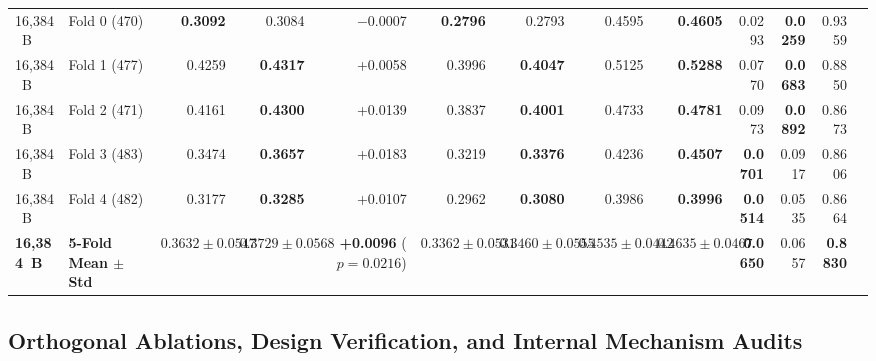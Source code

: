 \documentclass[journal]{IEEEtran}
\begin{document}
\begin{table}[!tbp]
{\begin{tabular}{llrrrrrrrrrrr}
\midrule
16,384~B & Fold 0 (470) & \textbf{0.3092} & 0.3084 & $-$0.0007 & \textbf{0.2796} & 0.2793 & 0.4595 & \textbf{0.4605} & 0.0293 & \textbf{0.0259} & 0.9359 \\
16,384~B & Fold 1 (477) & 0.4259 & \textbf{0.4317} & +0.0058 & 0.3996 & \textbf{0.4047} & 0.5125 & \textbf{0.5288} & 0.0770 & \textbf{0.0683} & 0.8850 \\
16,384~B & Fold 2 (471) & 0.4161 & \textbf{0.4300} & +0.0139 & 0.3837 & \textbf{0.4001} & 0.4733 & \textbf{0.4781} & 0.0973 & \textbf{0.0892} & 0.8673 \\
16,384~B & Fold 3 (483) & 0.3474 & \textbf{0.3657} & +0.0183 & 0.3219 & \textbf{0.3376} & 0.4236 & \textbf{0.4507} & \textbf{0.0701} & 0.0917 & 0.8606 \\
16,384~B & Fold 4 (482) & 0.3177 & \textbf{0.3285} & +0.0107 & 0.2962 & \textbf{0.3080} & 0.3986 & \textbf{0.3996} & \textbf{0.0514} & 0.0535 & 0.8664 \\
\rowcolor{oursrow}
\textbf{16,384~B} & \textbf{5-Fold Mean $\pm$ Std} & $0.3632 \pm 0.0547$ & {\boldmath$0.3729 \pm 0.0568$} & \textbf{+0.0096} ($p=0.0216$) & $0.3362 \pm 0.0531$ & {\boldmath$0.3460 \pm 0.0555$} & $0.4535 \pm 0.0442$ & {\boldmath$0.4635 \pm 0.0467$} & \textbf{0.0650} & 0.0657 & \textbf{0.8830} \\
\bottomrule
\end{tabular}}
\end{table}

\subsection{Orthogonal Ablations, Design Verification, and Internal Mechanism Audits}
\end{document}
